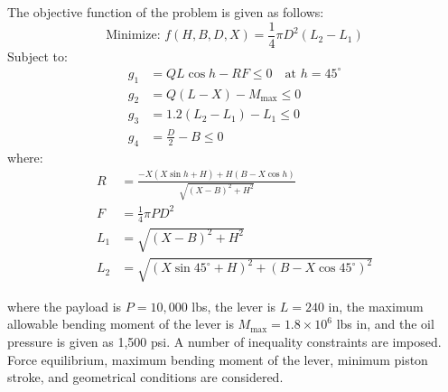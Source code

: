 \documentclass[
]{article}
\begin{document}
\begin{justify}
{The objective function of the problem is given as follows:
\[
\text{Minimize: } f(H, B, D, X) = \frac{1}{4} \pi D^2 (L_2 - L_1) \tag{21}
\]
Subject to:
\begin{align}
g_1 &= QL \cos{h} - RF \leq 0 \quad \text{at } h = 45^\circ  \tag{22} \\
g_2 &= Q(L - X) - M_{\text{max}} \leq 0 \tag{23} \\
g_3 &= 1.2(L_2 - L_1) - L_1 \leq 0 \tag{24} \\
g_4 &= \frac{D}{2} - B \leq 0 \tag{25}
\end{align}
where:
\begin{align}
R &= \frac{-X(X\sin{h} + H) + H(B - X\cos{h})}{\sqrt{(X - B)^2 + H^2}} \tag{26} \\
F &= \frac{1}{4} \pi PD^2 \tag{27} \\
L_1 &= \sqrt{(X - B)^2 + H^2} \tag{28} \\
L_2 &= \sqrt{(X \sin{45^\circ} + H)^2 + (B - X \cos{45^\circ})^2} \tag{29}
\end{align}


where the payload is \( P = 10,000 \) lbs, the lever is \( L = 240 \) in, the maximum allowable bending moment of the lever is \( M_{\text{max}} = 1.8 \times 10^6 \) lbs in, and the oil pressure is given as 1,500 psi. A number of inequality constraints are imposed. Force equilibrium, maximum bending moment of the lever, minimum piston stroke, and geometrical conditions are considered. 

}
\end{justify}
\end{document}
